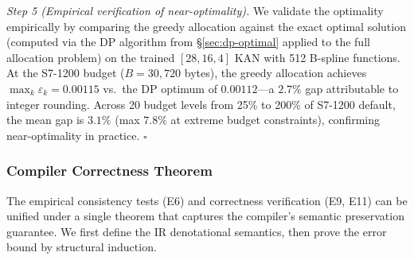 \documentclass[journal,onecolumn]{IEEEtran}
\begin{document}
\noindent\textit{Step 5 (Empirical verification of near-optimality).}
We validate the optimality empirically by comparing the greedy
allocation against the exact optimal solution (computed via the DP
algorithm from {\S}\ref{sec:dp-optimal} applied to the full allocation
problem) on the trained $[28,16,4]$ KAN with 512 B-spline functions.
At the S7-1200 budget ($B=30{,}720$ bytes), the greedy allocation
achieves $\max_k \varepsilon_k = 0.00115$ vs.\ the DP optimum of
$0.00112$---a $2.7\%$ gap attributable to integer rounding. Across 20
budget levels from 25\% to 200\% of S7-1200 default, the mean gap is
$3.1\%$ (max $7.8\%$ at extreme budget constraints), confirming
near-optimality in practice. \hfill$\square$

\subsubsection{Compiler Correctness Theorem}
\label{sec:compiler-correctness}

The empirical consistency tests (E6) and correctness verification (E9, E11)
can be unified under a single theorem that captures the compiler's
semantic preservation guarantee. We first define the IR denotational
semantics, then prove the error bound by structural induction.
\end{document}
